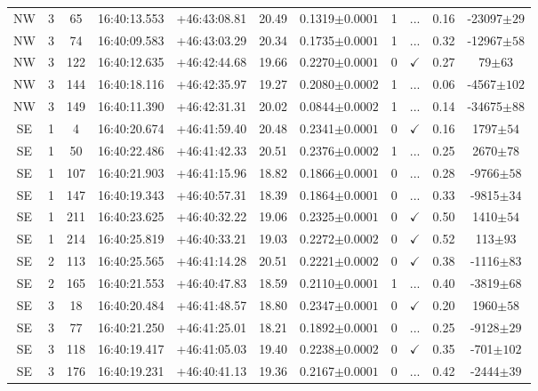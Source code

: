 \begin{landscape}
\begin{longtable}{ccccccccccc}
	NW & 3 & 65 & 16:40:13.553 & +46:43:08.81 & 20.49 & 0.1319$\pm{0.0001}$ & 1 & ... & 0.16 & -23097$\pm{29}$ \\
	NW & 3 & 74 & 16:40:09.583 & +46:43:03.29 & 20.34 & 0.1735$\pm{0.0001}$ & 1 & ... & 0.32 & -12967$\pm{58}$ \\
	NW & 3 & 122 & 16:40:12.635 & +46:42:44.68 & 19.66 & 0.2270$\pm{0.0001}$ & 0 & $\checkmark$ & 0.27 & 79$\pm{63}$ \\
	NW & 3 & 144 & 16:40:18.116 & +46:42:35.97 & 19.27 & 0.2080$\pm{0.0002}$ & 1 & ... & 0.06 & -4567$\pm{102}$ \\
	NW & 3 & 149 & 16:40:11.390 & +46:42:31.31 & 20.02 & 0.0844$\pm{0.0002}$ & 1 & ... & 0.14 & -34675$\pm{88}$ \\
	SE & 1 & 4 & 16:40:20.674 & +46:41:59.40 & 20.48 & 0.2341$\pm{0.0001}$ & 0 & $\checkmark$ & 0.16 & 1797$\pm{54}$ \\
	SE & 1 & 50 & 16:40:22.486 & +46:41:42.33 & 20.51 & 0.2376$\pm{0.0002}$ & 1 & ... & 0.25 & 2670$\pm{78}$ \\
	SE & 1 & 107 & 16:40:21.903 & +46:41:15.96 & 18.82 & 0.1866$\pm{0.0001}$ & 0 & ... & 0.28 & -9766$\pm{58}$ \\
	SE & 1 & 147 & 16:40:19.343 & +46:40:57.31 & 18.39 & 0.1864$\pm{0.0001}$ & 0 & ... & 0.33 & -9815$\pm{34}$ \\
	SE & 1 & 211 & 16:40:23.625 & +46:40:32.22 & 19.06 & 0.2325$\pm{0.0001}$ & 0 & $\checkmark$ & 0.50 & 1410$\pm{54}$ \\
	SE & 1 & 214 & 16:40:25.819 & +46:40:33.21 & 19.03 & 0.2272$\pm{0.0002}$ & 0 & $\checkmark$ & 0.52 & 113$\pm{93}$ \\
	SE & 2 & 113 & 16:40:25.565 & +46:41:14.28 & 20.51 & 0.2221$\pm{0.0002}$ & 0 & $\checkmark$ & 0.38 & -1116$\pm{83}$ \\
	SE & 2 & 165 & 16:40:21.553 & +46:40:47.83 & 18.59 & 0.2110$\pm{0.0001}$ & 1 & ... & 0.40 & -3819$\pm{68}$ \\
	SE & 3 & 18 & 16:40:20.484 & +46:41:48.57 & 18.80 & 0.2347$\pm{0.0001}$ & 0 & $\checkmark$ & 0.20 & 1960$\pm{58}$ \\
	SE & 3 & 77 & 16:40:21.250 & +46:41:25.01 & 18.21 & 0.1892$\pm{0.0001}$ & 0 & ... & 0.25 & -9128$\pm{29}$ \\
	SE & 3 & 118 & 16:40:19.417 & +46:41:05.03 & 19.40 & 0.2238$\pm{0.0002}$ & 0 & $\checkmark$ & 0.35 & -701$\pm{102}$ \\
	SE & 3 & 176 & 16:40:19.231 & +46:40:41.13 & 19.36 & 0.2167$\pm{0.0001}$ & 0 & ... & 0.42 & -2444$\pm{39}$ \\

\end{longtable}
\end{landscape}
